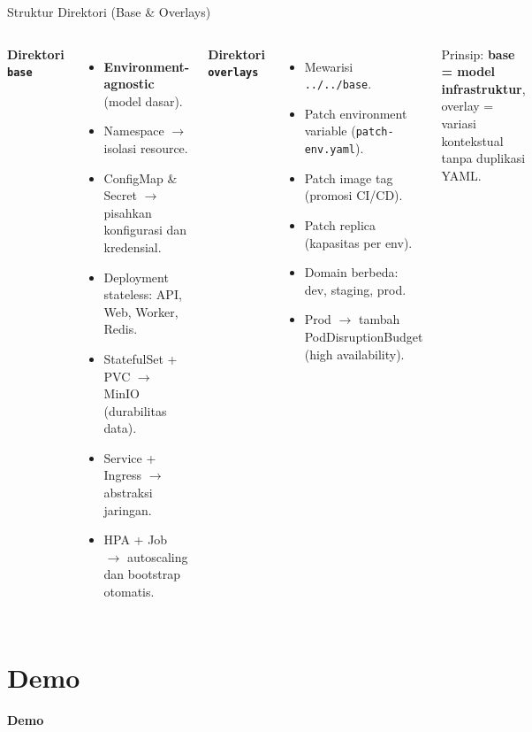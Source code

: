 \documentclass[aspectratio=169, table]{beamer}
\begin{document}
\begin{frame}{Struktur Direktori (Base \& Overlays)}
\vspace{10pt}
\begin{columns}[T]

\textbf{Direktori \texttt{base}}
\begin{itemize}
    \item \textbf{Environment-agnostic} (model dasar).
    \item Namespace $\rightarrow$ isolasi resource.
    \item ConfigMap \& Secret $\rightarrow$ pisahkan konfigurasi dan kredensial.
    \item Deployment stateless: API, Web, Worker, Redis.
    \item StatefulSet + PVC $\rightarrow$ MinIO (durabilitas data).
    \item Service + Ingress $\rightarrow$ abstraksi jaringan.
    \item HPA + Job $\rightarrow$ autoscaling dan bootstrap otomatis.
\end{itemize}

\textbf{Direktori \texttt{overlays}}
\begin{itemize}
    \item Mewarisi \texttt{../../base}.
    \item Patch environment variable (\texttt{patch-env.yaml}).
    \item Patch image tag (promosi CI/CD).
    \item Patch replica (kapasitas per env).
    \item Domain berbeda: dev, staging, prod.
    \item Prod $\rightarrow$ tambah PodDisruptionBudget (high availability).
\end{itemize}

\vspace{6pt}
\small
Prinsip: \textbf{base = model infrastruktur}, 
overlay = variasi kontekstual tanpa duplikasi YAML.
\end{columns}
\end{frame}

\section{Demo}
\begin{frame}{\hfill}
	\centering
	\Huge{\textbf{Demo}}
\end{frame}
\end{document}
